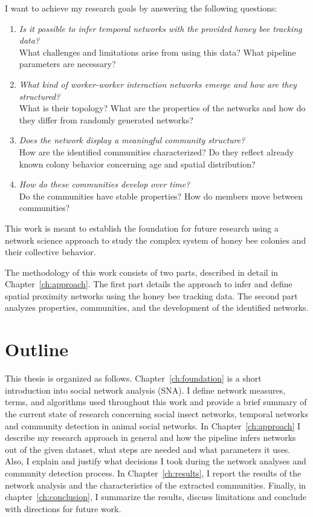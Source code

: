 I want to achieve my research goals by answering the following questions:

\begin{enumerate}
\item \emph{Is it possible to infer temporal networks with the provided honey bee tracking data?}\\
What challenges and limitations arise from using this data?
What pipeline parameters are necessary?
\item \emph{What kind of worker-worker interaction networks emerge and how are they structured?}\\
What is their topology?
What are the properties of the networks and how do they differ from randomly generated networks?
\item \emph{Does the network display a meaningful community structure?}\\
How are the identified communities characterized?
Do they reflect already known colony behavior concerning age and spatial distribution?
\item \emph{How do these communities develop over time?}\\
Do the communities have stable properties?
How do members move between communities?
\end{enumerate}


This work is meant to establish the foundation for future research using a network science approach to study the complex system of honey bee colonies and their collective behavior.

The methodology of this work consists of two parts, described in detail in Chapter~\ref{ch:approach}.
The first part details the approach to infer and define spatial proximity networks using the honey bee tracking data.
The second part analyzes properties, communities, and the development of the identified networks.  

\section{Outline}
This thesis is organized as follows.
Chapter~\ref{ch:foundation} is a short introduction into social network analysis (SNA). I define network measures, terms, and algorithms used throughout this work and provide a brief summary of the current state of research concerning social insect networks, temporal networks and community detection in animal social networks.
In Chapter~\ref{ch:approach} I describe my research approach in general and how the pipeline infers networks out of the given dataset, what steps are needed and what parameters it uses.
Also, I explain and justify what decisions I took during the network analyses and community detection process.
In Chapter~\ref{ch:results}, I report the results of the network analysis and the characteristics of the extracted communities.
Finally, in chapter~\ref{ch:conclusion}, I summarize the results, discuss limitations and conclude with directions for future work.